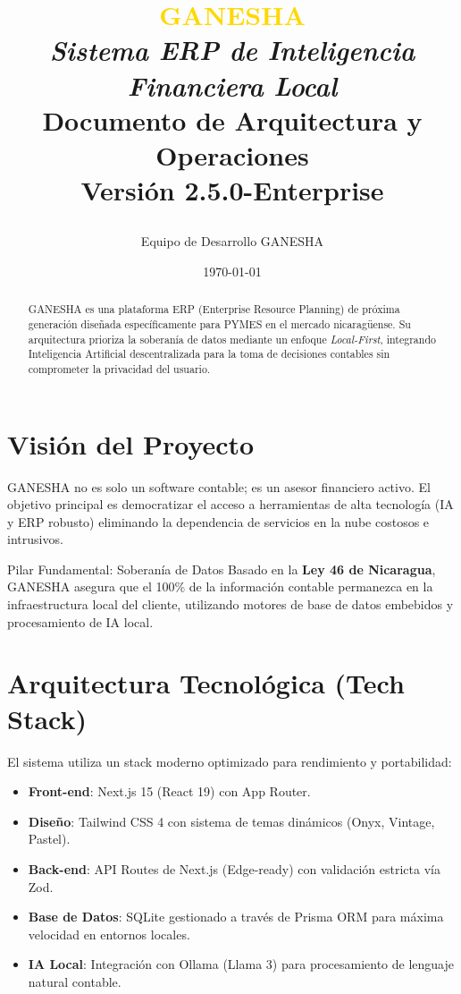 \documentclass[11pt,a4paper]{article}
\title{
    \vspace{-2cm}
    \begin{center}
        \textcolor{gold}{\Huge \textbf{GANESHA}}\\[0.5em]
        \textcolor{onyx}{\Large \textit{Sistema ERP de Inteligencia Financiera Local}}\\[1cm]
        \textbf{Documento de Arquitectura y Operaciones}\\[0.5em]
        \small{Versión 2.5.0-Enterprise}
    \end{center}
}
\author{Equipo de Desarrollo GANESHA}
\date{\today}
\begin{document}
\maketitle

\begin{abstract}
GANESHA es una plataforma ERP (Enterprise Resource Planning) de próxima generación diseñada específicamente para PYMES en el mercado nicaragüense. Su arquitectura prioriza la soberanía de datos mediante un enfoque \textit{Local-First}, integrando Inteligencia Artificial descentralizada para la toma de decisiones contables sin comprometer la privacidad del usuario.
\end{abstract}

\tableofcontents
\newpage

\section{Visión del Proyecto}
GANESHA no es solo un software contable; es un asesor financiero activo. El objetivo principal es democratizar el acceso a herramientas de alta tecnología (IA y ERP robusto) eliminando la dependencia de servicios en la nube costosos e intrusivos.

\begin{infobox}{Pilar Fundamental: Soberanía de Datos}
Basado en la \textbf{Ley 46 de Nicaragua}, GANESHA asegura que el 100\% de la información contable permanezca en la infraestructura local del cliente, utilizando motores de base de datos embebidos y procesamiento de IA local.
\end{infobox}

\section{Arquitectura Tecnológica (Tech Stack)}
El sistema utiliza un stack moderno optimizado para rendimiento y portabilidad:

\begin{itemize}[label=\textcolor{gold}{\textbullet}]
    \item \textbf{Front-end}: Next.js 15 (React 19) con App Router.
    \item \textbf{Diseño}: Tailwind CSS 4 con sistema de temas dinámicos (Onyx, Vintage, Pastel).
    \item \textbf{Back-end}: API Routes de Next.js (Edge-ready) con validación estricta vía Zod.
    \item \textbf{Base de Datos}: SQLite gestionado a través de Prisma ORM para máxima velocidad en entornos locales.
    \item \textbf{IA Local}: Integración con Ollama (Llama 3) para procesamiento de lenguaje natural contable.
\end{itemize}
\end{document}
